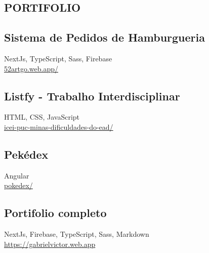 
\begin{framed}
  \section{PORTIFOLIO}
  \small\subsection{Sistema de Pedidos de Hamburgueria}
  \footnotesize{NextJs, TypeScript, Sass, Firebase}\\
  \href{https://52artgo.web.app/}{52artgo.web.app/}

  \small\subsection{Listfy - Trabalho Interdisciplinar}
  \footnotesize{HTML, CSS, JavaScript}\\
  \href{https://icei-puc-minas-pples-ti.github.io/plf-es-2021-1-ti1-7924100-dificuldades-do-ead/}{icei-puc-minas-dificuldades-do-ead/}

  \small\subsection{Pekédex}
  \footnotesize{Angular}\\
  \href{https://g4br-13-l.github.io/ego-death/dashboard}{pokedex/}

  \small\subsection{Portifolio completo}
  \footnotesize{NextJs, Firebase, TypeScript, Sass, Markdown}\\
  \href{https://gabrielvictor.web.app}{https://gabrielvictor.web.app}
\end{framed}
